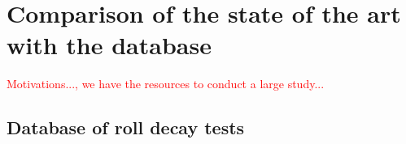 \section{Comparison of the state of the art with the database}
\textcolor{red}{Motivations..., we have the resources to conduct a large study...}

\subsection{Database of roll decay tests}
\label{se:database_of_roll_decay_tests}




